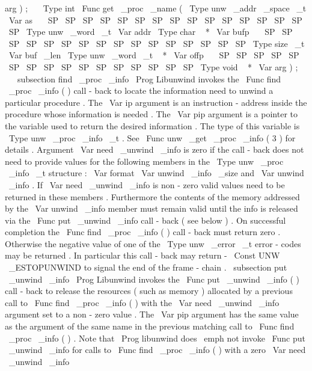 {
arg
}
)
;
\
\
\
Type
{
int
}
\
Func
{
get
\
_proc
\
_name
}
(
\
Type
{
unw
\
_addr
\
_space
\
_t
}
\
Var
{
as
}
\
\
\
SP
\
SP
\
SP
\
SP
\
SP
\
SP
\
SP
\
SP
\
SP
\
SP
\
SP
\
SP
\
SP
\
SP
\
SP
\
SP
\
Type
{
unw
\
_word
\
_t
}
\
Var
{
addr
}
\
Type
{
char
~
*
}
\
Var
{
bufp
}
\
\
\
SP
\
SP
\
SP
\
SP
\
SP
\
SP
\
SP
\
SP
\
SP
\
SP
\
SP
\
SP
\
SP
\
SP
\
SP
\
SP
\
Type
{
size
\
_t
}
\
Var
{
buf
\
_len
}
\
Type
{
unw
\
_word
\
_t
~
*
}
\
Var
{
offp
}
\
\
\
SP
\
SP
\
SP
\
SP
\
SP
\
SP
\
SP
\
SP
\
SP
\
SP
\
SP
\
SP
\
SP
\
SP
\
SP
\
SP
\
Type
{
void
~
*
}
\
Var
{
arg
}
)
;
\
\
\
subsection
{
find
\
_proc
\
_info
}
\
Prog
{
Libunwind
}
invokes
the
\
Func
{
find
\
_proc
\
_info
}
(
)
call
-
back
to
locate
the
information
need
to
unwind
a
particular
procedure
.
The
\
Var
{
ip
}
argument
is
an
instruction
-
address
inside
the
procedure
whose
information
is
needed
.
The
\
Var
{
pip
}
argument
is
a
pointer
to
the
variable
used
to
return
the
desired
information
.
The
type
of
this
variable
is
\
Type
{
unw
\
_proc
\
_info
\
_t
}
.
See
\
Func
{
unw
\
_get
\
_proc
\
_info
(
3
)
}
for
details
.
Argument
\
Var
{
need
\
_unwind
\
_info
}
is
zero
if
the
call
-
back
does
not
need
to
provide
values
for
the
following
members
in
the
\
Type
{
unw
\
_proc
\
_info
\
_t
}
structure
:
\
Var
{
format
}
\
Var
{
unwind
\
_info
\
_size
}
and
\
Var
{
unwind
\
_info
}
.
If
\
Var
{
need
\
_unwind
\
_info
}
is
non
-
zero
valid
values
need
to
be
returned
in
these
members
.
Furthermore
the
contents
of
the
memory
addressed
by
the
\
Var
{
unwind
\
_info
}
member
must
remain
valid
until
the
info
is
released
via
the
\
Func
{
put
\
_unwind
\
_info
}
call
-
back
(
see
below
)
.
On
successful
completion
the
\
Func
{
find
\
_proc
\
_info
}
(
)
call
-
back
must
return
zero
.
Otherwise
the
negative
value
of
one
of
the
\
Type
{
unw
\
_error
\
_t
}
error
-
codes
may
be
returned
.
In
particular
this
call
-
back
may
return
-
\
Const
{
UNW
\
_ESTOPUNWIND
}
to
signal
the
end
of
the
frame
-
chain
.
\
subsection
{
put
\
_unwind
\
_info
}
\
Prog
{
Libunwind
}
invokes
the
\
Func
{
put
\
_unwind
\
_info
}
(
)
call
-
back
to
release
the
resources
(
such
as
memory
)
allocated
by
a
previous
call
to
\
Func
{
find
\
_proc
\
_info
}
(
)
with
the
\
Var
{
need
\
_unwind
\
_info
}
argument
set
to
a
non
-
zero
value
.
The
\
Var
{
pip
}
argument
has
the
same
value
as
the
argument
of
the
same
name
in
the
previous
matching
call
to
\
Func
{
find
\
_proc
\
_info
}
(
)
.
Note
that
\
Prog
{
libunwind
}
does
\
emph
{
not
}
invoke
\
Func
{
put
\
_unwind
\
_info
}
for
calls
to
\
Func
{
find
\
_proc
\
_info
}
(
)
with
a
zero
\
Var
{
need
\
_unwind
\
_info
}
